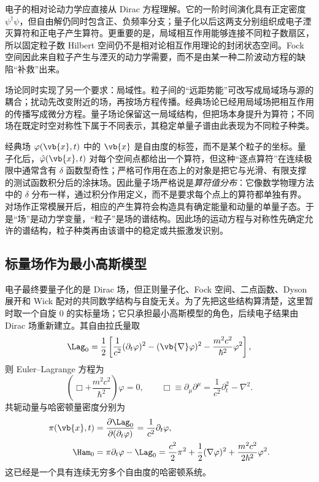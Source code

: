 电子的相对论动力学应直接从 Dirac 方程理解。它的一阶时间演化具有正定密度 $\psi^\dagger\psi$，但自由解仍同时包含正、负频率分支；量子化以后这两支分别组织成电子湮灭算符和正电子产生算符。更重要的是，局域相互作用能够连接不同粒子数扇区，所以固定粒子数 Hilbert 空间仍不是相对论相互作用理论的封闭状态空间。Fock 空间因此来自粒子产生与湮灭的动力学需要，而不是由某一种二阶波动方程的缺陷“补救”出来。

场论同时实现了另一个要求：局域性。粒子间的“远距势能”可改写成局域场与源的耦合；扰动先改变附近的场，再按场方程传播。经典场论已经用局域场把相互作用的传播写成微分方程。量子场论保留这一局域结构，但把场本身提升为算符；不同场在既定时空对称性下属于不同表示，其稳定单量子谱由此表现为不同粒子种类。

经典场 $\varphi(\vb{x},t)$ 中的 $\vb{x}$ 是自由度的标签，而不是某个粒子的坐标。量子化后，$\hat\varphi(\vb{x},t)$ 对每个空间点都给出一个算符，但这种“逐点算符”在连续极限中通常含有 $\delta$ 函数型奇性；严格可作用在态上的对象是把它与光滑、有限支撑的测试函数积分后的涂抹场。因此量子场严格说是\emph{算符值分布}：它像数学物理方法中的 $\delta$ 分布一样，通过积分作用定义，而不是要求每个点上的算符都单独有界。对场作正常模展开后，相应的产生算符会构造具有确定能量和动量的单量子态。于是“场”是动力学变量，“粒子”是场的谱结构。因此场的运动方程与对称性先确定允许的谱结构，粒子种类再由该谱中的稳定或共振激发识别。

\subsection{标量场作为最小高斯模型}

电子最终要量子化的是 Dirac 场，但正则量子化、Fock 空间、二点函数、Dyson 展开和 Wick 配对的共同数学结构与自旋无关。为了先把这些结构算清楚，这里暂时取一个自旋 $0$ 的实标量场；它只承担最小高斯模型的角色，后续电子结果由 Dirac 场重新建立。其自由拉氏量取
\begin{equation}
 \Lag_0
 =\frac12\left[
 \frac{1}{c^2}(\partial_t\varphi)^2
 -(\vb{\nabla}\varphi)^2
 -\frac{m^2c^2}{\hbar^2}\varphi^2
 \right],
 \label{eq:kg-lagrangian-r2}
\end{equation}
则 Euler--Lagrange 方程为
\begin{equation}
 \left(\Box+\frac{m^2c^2}{\hbar^2}\right)\varphi=0,
 \qquad
 \Box\equiv\partial_\mu\partial^\mu
 =\frac1{c^2}\partial_t^2-\nabla^2.
 \label{eq:kg-eom-r2}
\end{equation}
共轭动量与哈密顿量密度分别为
\begin{align}
 \pi(\vb{x},t)
 &=\frac{\partial\Lag_0}{\partial(\partial_t\varphi)}
 =\frac1{c^2}\partial_t\varphi,
 \label{eq:kg-pi-r2}\\
 \Ham_0
 &=\pi\partial_t\varphi-\Lag_0
 =\frac{c^2}{2}\pi^2
 +\frac12(\nabla\varphi)^2
 +\frac{m^2c^2}{2\hbar^2}\varphi^2.
 \label{eq:kg-H-density-r2}
\end{align}
这已经是一个具有连续无穷多个自由度的哈密顿系统。

